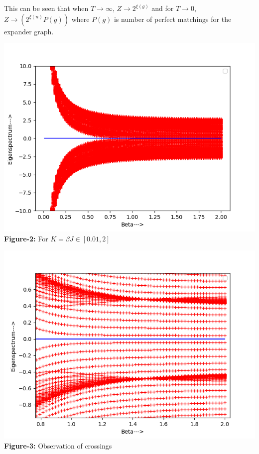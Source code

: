 \documentclass{article}
\begin{document}
     This can be seen that when $T \to \infty$, $Z \to 2^{\xi(g)}$ and for $T \to 0$, $Z \to (2^{\xi(n)}P(g))$ where $P(g)$ is number of perfect matchings for the expander graph.\\
     
     \begin{center}
     	\includegraphics[scale=0.5]{Hyperbolic lattice eigenspectrum 1.png}\\
     	\textbf{Figure-2:} For $K=\beta J \in [0.01,2]$\\
     \end{center}
     
     \begin{center}
     	\includegraphics[scale=0.5]{Crossings.png}\\
     	\textbf{Figure-3:} Observation of crossings\\
     \end{center}
   
\end{document}
